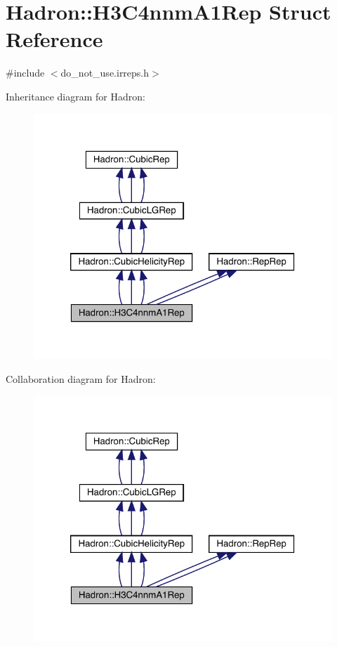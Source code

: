 \hypertarget{structHadron_1_1H3C4nnmA1Rep}{}\section{Hadron\+:\+:H3\+C4nnm\+A1\+Rep Struct Reference}
\label{structHadron_1_1H3C4nnmA1Rep}


{\ttfamily \#include $<$do\+\_\+not\+\_\+use.\+irreps.\+h$>$}



Inheritance diagram for Hadron\+:
\nopagebreak
\begin{figure}[H]
\begin{center}
\leavevmode
\includegraphics[width=320pt]{df/d45/structHadron_1_1H3C4nnmA1Rep__inherit__graph}
\end{center}
\end{figure}


Collaboration diagram for Hadron\+:
\nopagebreak
\begin{figure}[H]
\begin{center}
\leavevmode
\includegraphics[width=320pt]{d5/d3f/structHadron_1_1H3C4nnmA1Rep__coll__graph}
\end{center}
\end{figure}
